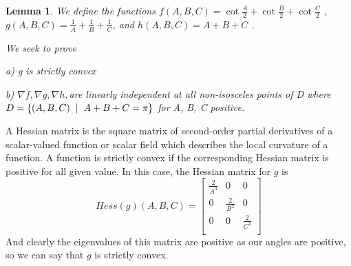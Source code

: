 \documentclass[12pt]{report}
\newtheorem{lemma}[theorem]{Lemma}
\numberwithin{definition}{section}
\begin{document}
 
 
 
 
 
 
 
   
 
 
 
 
 
 
 
 
 
 \begin{lemma}
   We define the functions $f(A, B, C) = \cot{\frac{A}{2}}+\cot{\frac{B}{2}}+\cot{\frac{C}{2}}$ , $g(A, B, C)=\frac{1}{A}+\frac{1}{B}+\frac{1}{C}$, and $h(A, B, C) = A+B+C$ .
   
We seek to prove  

    
  
	a) g is strictly convex 
	
	    
	  
	b) $\nabla f, \nabla g,  \nabla h, $are linearly independent at all non-isosceles points of D where $D = \{(A, B, C) \hspace{2mm}|\hspace{2mm} A+B+C = \pi\}$ for A, B, C positive. 
 
 \end{lemma}
   
 

     
   

     
     A Hessian matrix is the square matrix of second-order partial derivatives of a scalar-valued function or scalar field which describes the local curvature of a function. A function is strictly convex if the corresponding Hessian matrix is positive for all given value. In this case, the Hessian matrix for $g$ is 
  \[
     Hess(g)(A,B,C) = \begin{bmatrix} 
     \frac{2}{A^3}			 & 0 			& 0 \\
     0 					 &  \frac{2}{B^3}&0\\
     0 					& 0 &  \frac{2}{C^3}\\ 
     \end{bmatrix}
    \]
 And clearly the eigenvalues of this matrix are positive as our angles are positive, so we can say that $g$ is strictly convex. 
 
 
     
 
 	     

 
 
\end{document}
